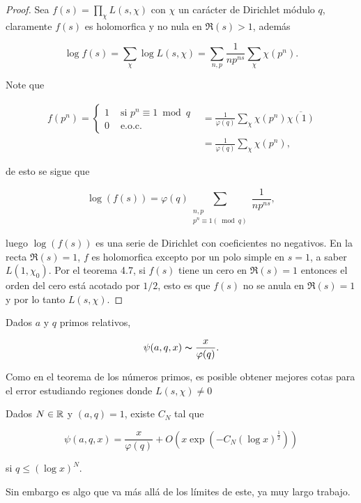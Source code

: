 \begin{proof}
    Sea $f(s)=\prod_\chi L(s,\chi)$ con $\chi$ un carácter de Dirichlet módulo $q$, claramente $f(s)$ es holomorfica y no nula en $\Re(s)>1$, además

    $$\log f(s)=\sum_\chi \log L(s, \chi)=\sum_{n, p} \frac{1}{n p^{n s}} \sum_\chi \chi\left(p^n\right).$$

    Note que 

    \begin{align*}
        f(p^n)=\begin{cases}
        1 &\text{ si }p^n\equiv 1 \bmod{q}\\
        0 &\text{ e.o.c.}
    \end{cases}&=\frac{1}{\varphi(q)}\sum_\chi \chi(p^n)\overline{\chi(1)}\\
    &=\frac{1}{\varphi(q)}\sum_\chi \chi(p^n)
    ,\end{align*}

    de esto se sigue que 

    $$\log(f(s))=\varphi(q) \sum_{\substack{n, p \\ p^n \equiv 1(\bmod q)}} \frac{1}{n p^{n s}},$$

    luego $\log(f(s))$ es una serie de Dirichlet con coeficientes no negativos. En la recta $\Re(s)=1$, $f$ es holomorfica excepto por un polo simple en $s=1$, a saber $L(1,\chi_0)$. Por el teorema 4.7, si $f(s)$ tiene un cero  en $\Re(s)=1$ entonces el orden del cero está acotado por $1/2$, esto es que $f(s)$ no se anula en $\Re(s)=1$ y por lo tanto $L(s,\chi)$.
\end{proof}

\begin{corollary}
    Dados $a$ y $q$ primos relativos,

    $$\psi(a,q,x)\thicksim \frac{x}{\varphi(q)}.$$
\end{corollary}

Como en el teorema de los números primos, es posible obtener mejores cotas para el error estudiando regiones donde $L(s,\chi)\neq 0$

\begin{theorem}
Dados $N\in \mathbb{R}$ y $(a,q)=1$, existe $C_N$ tal que

$$\psi(a, q, x)=\frac{x}{\varphi(q)}+O\left(x \exp \left(-C_N(\log x)^{\frac{1}{2}}\right)\right)$$

si $q \leq(\log x)^N .$
\end{theorem}

Sin embargo es algo que va más allá de los límites de este, ya muy largo trabajo.